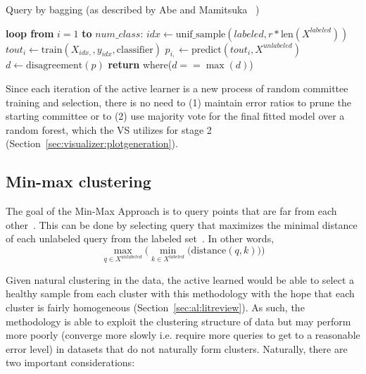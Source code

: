 \tablespacing
\begin{algorithm}[H]
	\caption{Query by bagging (as described by Abe and Mamitsuka 
	~\cite{abe1998})}\label{alg:al:methods:bagging}
	\begin{algorithmic}[1]
		\State \textbf{loop from} $i=1$ \textbf{to} $num\_class$:
		\State \indent $idx \gets \text{unif\_sample}(labeled, 
		r*\text{len}(X^{labeled}) )$
		\State \indent $\textit{tout}_{i} \gets 
		\text{train}(X_{idx, },y_{idx},\text{classifier})$
		\State \indent $p_{i,} \gets 
		\text{predict}(\textit{tout}_i,X^{unlabeled})$
		\State $d \gets \text{disagreement}(p)$
		\State \textbf{return} where($d==\max{(d)}$)
		\EndProcedure
	\end{algorithmic}
\end{algorithm}
\bodyspacing

\noindent Since each iteration of the active learner is a new process of random 
committee 
training and selection, there is no need to (1) maintain error ratios to prune 
the starting committee or to (2) use majority vote for the final 
fitted model over a random forest, which the VS utilizes for stage 
2 (Section~\ref{sec:visualizer:plotgeneration}).










\subsection{Min-max clustering}
\label{sec:al:methods:clustering}

The goal of the Min-Max Approach is to query points that are far from each 
other~\cite{vu2010}. This can be done by selecting query that maximizes the 
minimal distance of each unlabeled query from the labeled set~\cite{vu2010}. 
In other words, 
$$\max\limits_{q \in X^{unlabeled}} \bigg( \min\limits_{k \in X^{labeled}} 
\bigg( \text{distance}(q,k) \bigg) \bigg)$$

Given natural clustering in the data, the active learned would be able to 
select a healthy sample from each cluster with this methodology with the hope 
that each cluster is fairly homogeneous (Section~\ref{sec:al:litreview}). As 
such, the methodology is able to exploit the clustering structure of data but 
may perform more poorly (converge more slowly i.e. require more queries to get 
to a reasonable error level) in datasets that do not naturally form clusters. 
Naturally, there are two important considerations:

